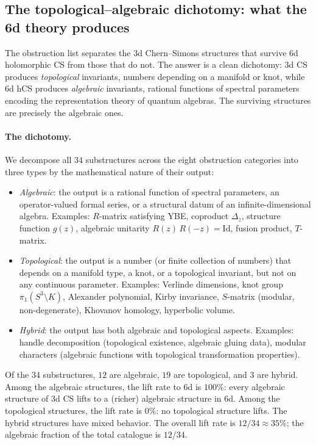 \subsection{The topological--algebraic dichotomy: what the 6d theory produces}
\label{subsec:topological-algebraic-dichotomy}

The obstruction list separates the 3d Chern--Simons structures that
survive 6d holomorphic CS from those that do not.  The answer is a
clean dichotomy: 3d CS produces \emph{topological} invariants, numbers
depending on a manifold or knot, while 6d hCS produces
\emph{algebraic} invariants, rational functions of spectral parameters
encoding the representation theory of quantum algebras. The surviving
structures are precisely the algebraic ones.

\paragraph{The dichotomy.}
We decompose all $34$ substructures across the eight obstruction categories into three types by the mathematical nature of their output:
\begin{itemize}
 \item \emph{Algebraic}: the output is a rational function of spectral parameters, an operator-valued formal series, or a structural datum of an infinite-dimensional algebra. Examples: $R$-matrix satisfying YBE, coproduct $\Delta_z$, structure function $g(z)$, algebraic unitarity $R(z)\,R(-z) = \mathrm{Id}$, fusion product, $T$-matrix.
 \item \emph{Topological}: the output is a number (or finite collection of numbers) that depends on a manifold type, a knot, or a topological invariant, but not on any continuous parameter. Examples: Verlinde dimensions, knot group $\pi_1(S^3 \setminus K)$, Alexander polynomial, Kirby invariance, $S$-matrix (modular, non-degenerate), Khovanov homology, hyperbolic volume.
 \item \emph{Hybrid}: the output has both algebraic and topological aspects. Examples: handle decomposition (topological existence, algebraic gluing data), modular characters (algebraic functions with topological transformation properties).
\end{itemize}
Of the $34$ substructures, $12$ are algebraic, $19$ are topological, and $3$ are hybrid. Among the algebraic structures, the lift rate to 6d is $100\%$: every algebraic structure of 3d CS lifts to a (richer) algebraic structure in 6d. Among the topological structures, the lift rate is $0\%$: no topological structure lifts. The hybrid structures have mixed behavior. The overall lift rate is $12/34 \approx 35\%$; the algebraic fraction of the total catalogue is $12/34$.

